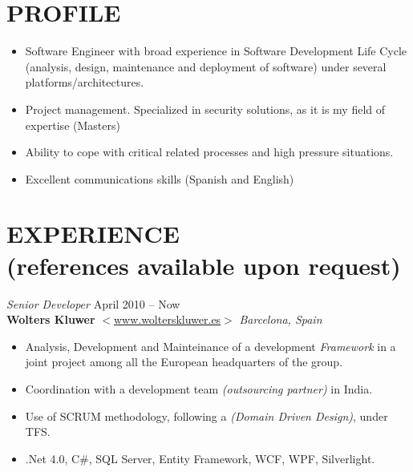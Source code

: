 \documentclass[line,margin]{res}
\begin{document}
\address{+34 678714822 / roberlamerma@gmail.com}

\begin{resume}
 
\section{PROFILE}       
                \begin{itemize}  \itemsep 2pt %
                \item Software Engineer with broad experience in Software 
                Development Life Cycle (analysis, design, maintenance and
                deployment of software) under several platforms/architectures.               
                \item Project management. Specialized in security solutions, as
                it is my field of expertise (Masters)
                \item Ability to cope with critical related processes and high 
                pressure situations.              
                \item Excellent communications skills (Spanish and English)
                \end{itemize}
         
\section{EXPERIENCE \\ \footnotesize{(references available upon request)}}
                {\sl Senior Developer} \hfill April 2010 -- Now \\
                \textbf{Wolters Kluwer} 
                $<$\url{www.wolterskluwer.es}$>$ \hfill \textit{Barcelona, Spain}
                \begin{itemize}  \itemsep 2pt %
                \item Analysis, Development and Mainteinance of a development \textit{Framework} 
                in a joint project among all the European headquarters of the group.
                \item Coordination with a development team \textit{(outsourcing partner)} 
                in India.
                \item Use of SCRUM methodology, following a \textit{(Domain Driven Design)}, under
                TFS.
                \item .Net 4.0, C{\#}, SQL Server, Entity Framework, WCF, WPF, Silverlight.
                \\
                \end{itemize}
                

\end{resume}
\end{document}
